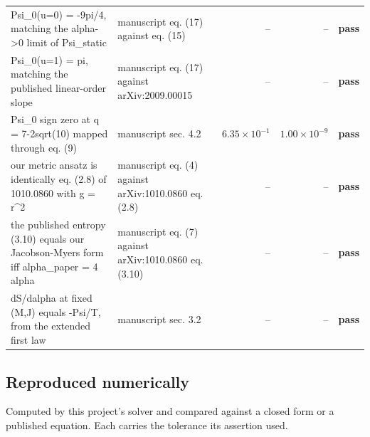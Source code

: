 \documentclass[11pt,a4paper]{article}
\newcommand{\PASS}{\textcolor{pass}{\textbf{pass}}}
\begin{document}
\begin{longtable}{@{}L{.38\textwidth}L{.24\textwidth}rrc@{}}
Psi\_0(u=0) = -9pi/4, matching the alpha->0 limit of Psi\_static & manuscript eq. (17) against eq. (15) & -- & -- & \PASS \\
Psi\_0(u=1) = pi, matching the published linear-order slope & manuscript eq. (17) against arXiv:2009.00015 & -- & -- & \PASS \\
Psi\_0 sign zero at q = 7-2sqrt(10) mapped through eq. (9) & manuscript sec. 4.2 & $6.35\times10^{-1}$ & $1.00\times10^{-9}$ & \PASS \\
our metric ansatz is identically eq. (2.8) of 1010.0860 with g = r\textasciicircum{}2 & manuscript eq. (4) against arXiv:1010.0860 eq. (2.8) & -- & -- & \PASS \\
the published entropy (3.10) equals our Jacobson-Myers form iff alpha\_paper = 4 alpha & manuscript eq. (7) against arXiv:1010.0860 eq. (3.10) & -- & -- & \PASS \\
dS/dalpha at fixed (M,J) equals -Psi/T, from the extended first law & manuscript sec. 3.2 & -- & -- & \PASS \\
\bottomrule
\end{longtable}

\subsection*{Reproduced numerically}
Computed by this project's solver and compared against a closed form or a published equation. Each carries the tolerance its assertion used.
\end{document}
